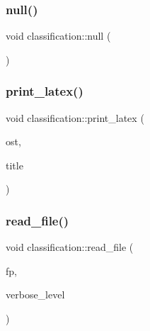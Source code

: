 \mbox{\label{classclassification_a9489c0ef3287fa50dca8c925217105b2}} 
\subsubsection{\texorpdfstring{null()}{null()}}
{\footnotesize\ttfamily void classification\+::null (\begin{DoxyParamCaption}{ }\end{DoxyParamCaption})}

\mbox{\label{classclassification_a9601dec979b0108e6f44c4169786bac8}} 
\subsubsection{\texorpdfstring{print\+\_\+latex()}{print\_latex()}}
{\footnotesize\ttfamily void classification\+::print\+\_\+latex (\begin{DoxyParamCaption}\item[{ostream \&}]{ost,  }\item[{const \mbox{\hyperlink{galois_8h_ab6cc7b4aeb6ea31aba2b3fbfc83ff5e6}{B\+Y\+TE}} $\ast$}]{title }\end{DoxyParamCaption})}

\mbox{\label{classclassification_a6bc81afec480f7f7a928a23f1f4cae1a}} 
\subsubsection{\texorpdfstring{read\+\_\+file()}{read\_file()}}
{\footnotesize\ttfamily void classification\+::read\+\_\+file (\begin{DoxyParamCaption}\item[{ifstream \&}]{fp,  }\item[{\mbox{\hyperlink{galois_8h_a09fddde158a3a20bd2dcadb609de11dc}{I\+NT}}}]{verbose\+\_\+level }\end{DoxyParamCaption})}

\mbox{\label{classclassification_ad1054483a58da9a4046e951a06da4d01}} 

